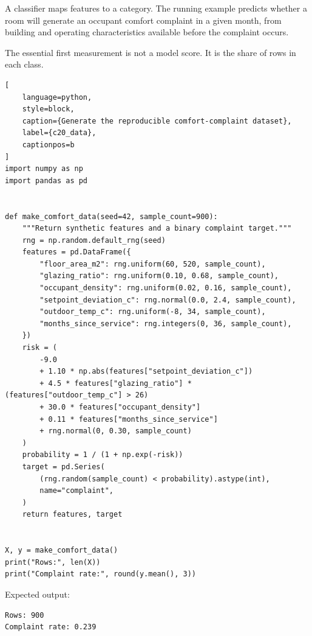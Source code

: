 
A classifier maps features to a category. The running example predicts whether a
room will generate an occupant comfort complaint in a given month, from
building and operating characteristics available before the complaint occurs.

The essential first measurement is not a model score. It is the share of rows in
each class.

\begin{lstlisting}[
    language=python,
    style=block,
    caption={Generate the reproducible comfort-complaint dataset},
    label={c20_data},
    captionpos=b
]
import numpy as np
import pandas as pd


def make_comfort_data(seed=42, sample_count=900):
    """Return synthetic features and a binary complaint target."""
    rng = np.random.default_rng(seed)
    features = pd.DataFrame({
        "floor_area_m2": rng.uniform(60, 520, sample_count),
        "glazing_ratio": rng.uniform(0.10, 0.68, sample_count),
        "occupant_density": rng.uniform(0.02, 0.16, sample_count),
        "setpoint_deviation_c": rng.normal(0.0, 2.4, sample_count),
        "outdoor_temp_c": rng.uniform(-8, 34, sample_count),
        "months_since_service": rng.integers(0, 36, sample_count),
    })
    risk = (
        -9.0
        + 1.10 * np.abs(features["setpoint_deviation_c"])
        + 4.5 * features["glazing_ratio"] * (features["outdoor_temp_c"] > 26)
        + 30.0 * features["occupant_density"]
        + 0.11 * features["months_since_service"]
        + rng.normal(0, 0.30, sample_count)
    )
    probability = 1 / (1 + np.exp(-risk))
    target = pd.Series(
        (rng.random(sample_count) < probability).astype(int),
        name="complaint",
    )
    return features, target


X, y = make_comfort_data()
print("Rows:", len(X))
print("Complaint rate:", round(y.mean(), 3))
\end{lstlisting}

Expected output:

\begin{lstlisting}[language=text, style=block, caption={An imbalanced target}, label={c20_data_output}, captionpos=b]
Rows: 900
Complaint rate: 0.239
\end{lstlisting}


